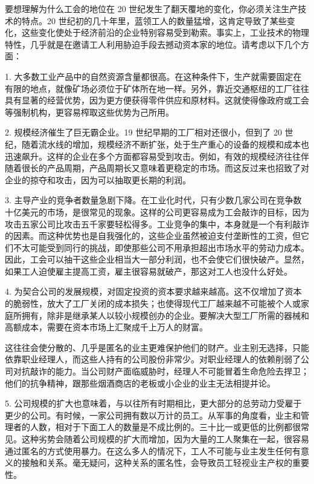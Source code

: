 要想理解为什么工会的地位在 20 世纪发生了翻天覆地的变化，你必须关注生产技术的特点。20 世纪初的几十年里，蓝领工人的数量猛增，这肯定导致了某些变化，这些变化使处于经济前沿的企业特别容易受到勒索。事实上，工业技术的物理特性，几乎就是在邀请工人利用胁迫手段去撼动资本家的地位。请考虑以下几个方面：

1. 大多数工业产品中的自然资源含量都很高。在这种条件下，生产就需要固定在有限的地点，就像矿场必须位于矿体所在地一样。另外，靠近交通枢纽的工厂往往具有显著的经营优势，因为更方便获得零件供应和原材料。这就使得像政府或工会等强制机构，更容易榨取这些优势为己所用。

2. 规模经济催生了巨无霸企业。19 世纪早期的工厂相对还很小，但到了 20 世纪，随着流水线的增加，规模经济不断扩张，处于生产重心的设备的规模和成本也迅速飙升。这样的企业在多个方面都容易受到攻击。例如，有效的规模经济往往伴随着很长的产品周期，产品周期长又意味着更稳定的市场。而这反过来也招致了对企业的掠夺和攻击，因为可以抽取更长期的利润。

3. 主导产业的竞争者数量急剧下降。在工业化时代，只有少数几家公司在竞争数十亿美元的市场，是很常见的现象。这样的公司更容易成为工会敲诈的目标，因为攻击五家公司比攻击五千家要轻松得多。工业竞争的集中，本身就是一个有利敲诈的因素。而这种优势也是自我强化的，这些企业虽然被迫支付垄断性的工资，但它们不太可能受到同行的挑战，即使那些公司不用承担超出市场水平的劳动力成本。因此，工会可以抽干这些企业相当大一部分利润，也不会使它们很快破产。显然，如果工人迫使雇主提高工资，雇主很容易就破产，那这对工人也没什么好处。

4. 为契合公司的发展规模，对固定投资的资本要求越来越高。这不仅增加了资本的脆弱性，放大了工厂关闭的成本损失；也使得现代工厂越来越不可能被个人或家庭所拥有，除非是继承某人以较小规模创办的企业。要解决大型工厂所需的器械和高额成本，需要在资本市场上汇聚成千上万人的财富。

这往往会使分散的、几乎是匿名的业主更难保护他们的财产。业主别无选择，只能依靠职业经理人，而这些人持有的公司股份非常少。对职业经理人的依赖削弱了公司对抗敲诈的能力。当公司财产面临威胁时，经理人不可能冒着生命危险去捍卫；他们的抗争精神，跟那些烟酒商店的老板或小企业的业主无法相提并论。

5. 公司规模的扩大也意味着，与以往所有时期相比，更大部分的总劳动力受雇于更少的公司。有时候，一家公司拥有数以万计的员工。从军事的角度看，业主和管理者的人数，相对于下面工人的数量是不成比例的。三十比一或更低的比例都很常见。这种劣势会随着公司规模的扩大而增加，因为大量的工人聚集在一起，很容易通过匿名的方式使用暴力。在这么多人的情况下，工人不可能与业主发生任何有意义的接触和关系。毫无疑问，这种关系的匿名性，会导致员工轻视业主产权的重要性。

